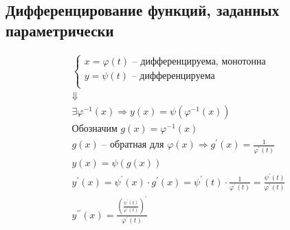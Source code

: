 \documentclass[12pt, fleqn]{article}
\begin{document}
\subsection{Дифференцирование функций, заданных параметрически}
\begin{multline*}
	\begin{cases}
		x=\varphi(t) \text{ -- дифференцируема, монотонна}\\
		y=\psi(t)\text{ -- дифференцируема}\\
	\end{cases}\\
	\Downarrow\\
	\exists \varphi^{-1}(x)\Rightarrow y(x)=\psi\left(\varphi^{-1}(x)\right)\\
	\text{Обозначим } g(x)=\varphi^{-1}(x)\\
	g(x) \text{ -- обратная для }\varphi(x)\Rightarrow g^\prime(x)=\frac{1}{\varphi^\prime(t)}\\
	y(x)= \psi(g(x))\\
	y^\prime(x)=\psi^\prime(x)\cdot g^\prime(x) = \psi^\prime(t)\cdot \frac{1}{\varphi^\prime(t)}=\frac{\psi^\prime(t)}{\varphi^\prime(t)}\\
	y^{\prime\prime}(x)=\frac{\left(\frac{\psi^\prime(t)}{\varphi^\prime(t)}\right)^\prime}{\varphi^\prime(t)}\\
\end{multline*}
\end{document}
